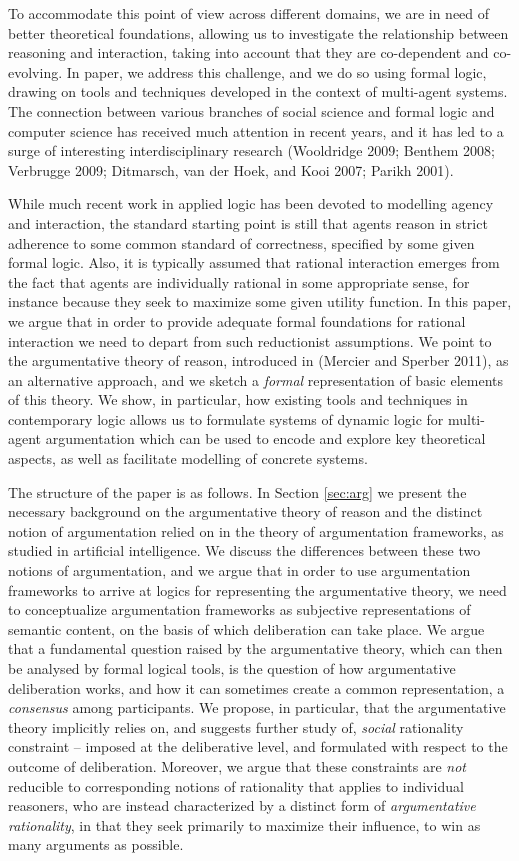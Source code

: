 \documentclass{article}
\begin{document}
To accommodate this point of view across different domains, we are in need of better theoretical foundations, allowing us to investigate the relationship between reasoning and interaction, taking into account that they are co-dependent and co-evolving. In paper, we address this challenge, and we do so using formal logic, drawing on tools and techniques developed in the context of multi-agent systems. The connection between various branches of social science and formal logic and computer science has received much attention in recent years, and it has led to a surge of interesting interdisciplinary research (Wooldridge 2009; Benthem 2008; Verbrugge 2009; Ditmarsch, van der Hoek, and Kooi 2007; Parikh 2001).

While much recent work in applied logic has been devoted to modelling agency and interaction, the standard starting point is still that agents reason in strict adherence to some common standard of correctness, specified by some given formal logic. Also, it is typically assumed that rational interaction emerges from the fact that agents are individually rational in some appropriate sense, for instance because they seek to maximize some given utility function. In this paper, we argue that in order to provide adequate formal foundations for rational interaction we need to depart from such reductionist assumptions. We point to the argumentative theory of reason, introduced in (Mercier and Sperber 2011), as an alternative approach, and we sketch a \emph{formal} representation of basic elements of this theory. We show, in particular, how existing tools and techniques in contemporary logic allows us to formulate systems of dynamic logic for multi-agent argumentation which can be used to encode and explore key theoretical aspects, as well as facilitate modelling of concrete systems.

The structure of the paper is as follows. In Section \ref{sec:arg} we present the necessary background on the argumentative theory of reason and the distinct notion of argumentation relied on in the theory of argumentation frameworks, as studied in artificial intelligence. We discuss the differences between these two notions of argumentation, and we argue that in order to use argumentation frameworks to arrive at logics for representing the argumentative theory, we need to conceptualize argumentation frameworks as subjective representations of semantic content, on the basis of which deliberation can take place. We argue that a fundamental question raised by the argumentative theory, which can then be analysed by formal logical tools, is the question of how argumentative deliberation works, and how it can sometimes create a common representation, a \emph{consensus} among participants. We propose, in particular, that the argumentative theory implicitly relies on, and suggests further study of, \emph{social} rationality constraint -- imposed at the deliberative level, and formulated with respect to the outcome of deliberation. Moreover, we argue that these constraints are \emph{not} reducible to corresponding notions of rationality that applies to individual reasoners, who are instead characterized by a distinct form of \emph{argumentative rationality}, in that they seek primarily to maximize their influence, to win as many arguments as possible.
\end{document}
